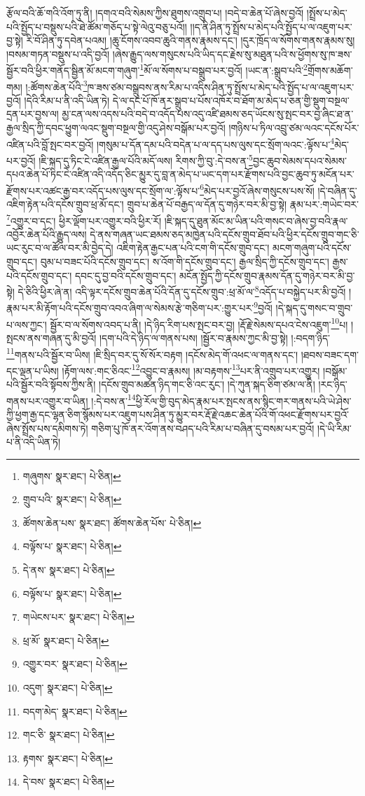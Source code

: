 རྩོལ་བའི་ཆོ་གའི་འོག་ཏུ་ནི། །དགའ་བའི་སེམས་ཀྱིས་ཐུགས་འགྲུབ་པ། །བདེ་བ་ཆེན་པོ་ཞེས་བྱའོ། །སྤྲོས་པ་མེད་པའི་སྤྱོད་པ་བསྡུས་པའི་ཐེ་ཚོམ་གཅོད་པ་སྟེ་ལེའུ་བཅུ་པའོ།། །།ད་ནི་ཤིན་ཏུ་སྤྲོས་པ་མེད་པའི་སྤྱོད་པ་ལ་འཇུག་པར་བྱ་སྟེ། རི་བོ་ཤིན་ཏུ་དབེན་པའམ། །ཆུ་ངོགས་འབབ་ཆུའི་གནས་རྣམས་དང་། །དུར་ཁྲོད་ལ་སོགས་གནས་རྣམས་སུ། །བསམ་གཏན་བསྡུས་པ་འདི་བྱའོ། །ཞེས་རྒྱུད་ལས་གསུངས་པའི་ཡིད་དང་རྗེས་སུ་མཐུན་པའི་ས་ཕྱོགས་སུ་ཁ་ཟས་སྦྱོར་བའི་ཕྱིར་གནོད་སྦྱིན་མོ་མངག་གཞུག་\footnote{གཞུགས་  སྣར་ཐང་།  པེ་ཅིན། }མོ་ལ་སོགས་པ་བསྒྲུབ་པར་བྱའོ། །ཡང་ན་:སྒྲུབ་པའི་\footnote{གྲུབ་པའི་  སྣར་ཐང་།  པེ་ཅིན། }གྲོགས་མཆོག་གམ། །:ཚོགས་ཆེན་པོའི་\footnote{ཚོགས་ཆེན་པས་  སྣར་ཐང་། ཚོགས་ཆེན་པོས་  པེ་ཅིན། }ཁ་ཟས་ཙམ་བསྒྲུབས་ནས་རིམ་པ་འདིས་ཤིན་ཏུ་སྤྲོས་པ་མེད་པའི་སྤྱོད་པ་ལ་འཇུག་པར་བྱའོ། །དེའི་རིམ་པ་ནི་འདི་ཡིན་ཏེ། དེ་ལ་དང་པོ་ཁོ་ནར་སྒྲུབ་པ་པོས་འཁོར་བ་ཐོག་མ་མེད་པ་ཅན་གྱི་སྡུག་བསྔལ་དྲན་པར་བྱས་ལ། མྱ་ངན་ལས་འདས་པའི་བདེ་བ་འདོད་པས་འདུ་འཛི་ཐམས་ཅད་ཡོངས་སུ་སྤང་བར་བྱ་ཞིང་ཐ་ན་རྒྱལ་སྲིད་ཀྱི་དབང་ཕྱུག་ལའང་སྡུག་བསྔལ་གྱི་འདུ་ཤེས་བསྒོམ་པར་བྱའོ། །གཉིས་པ་ཏིལ་འབྲུ་ཙམ་ལའང་དངོས་པོར་འཛིན་པའི་བློ་སྤང་བར་བྱའོ། །གསུམ་པ་དོན་དམ་པའི་བདེན་པ་ལ་དད་པས་ལུས་དང་སྲོག་ལའང་:ལྟོས་པ་\footnote{བལྟོས་པ་  སྣར་ཐང་།  པེ་ཅིན། }མེད་པར་བྱའོ། །ཇི་སྐད་དུ་ཏིང་ངེ་འཛིན་རྒྱལ་པོའི་མདོ་ལས། རིགས་ཀྱི་བུ་:དེ་བས་ན་\footnote{དེ་ནས་  སྣར་ཐང་།  པེ་ཅིན། }བྱང་ཆུབ་སེམས་དཔའ་སེམས་དཔའ་ཆེན་པོ་ཏིང་ངེ་འཛིན་འདི་འདོད་ཅིང་མྱུར་དུ་བླ་ན་མེད་པ་ཡང་དག་པར་རྫོགས་པའི་བྱང་ཆུབ་ཏུ་མངོན་པར་རྫོགས་པར་འཚང་རྒྱ་བར་འདོད་པས་ལུས་དང་སྲོག་ལ་:ལྟོས་པ་\footnote{བལྟོས་པ་  སྣར་ཐང་།  པེ་ཅིན། }མེད་པར་བྱའོ་ཞེས་གསུངས་པས་སོ། །དེ་བཞིན་དུ་འཇིག་རྟེན་པའི་དངོས་གྲུབ་ཕྲ་མོ་དང་། གྲུབ་པ་ཆེན་པོ་བརྒྱད་ལ་དོན་དུ་གཉེར་བར་མི་བྱ་སྟེ། རྣམ་པར་:གཡེང་བར་\footnote{གཡེངས་པར་  སྣར་ཐང་།  པེ་ཅིན། }འགྱུར་བ་དང་། ཕྱིར་ལྡོག་པར་འགྱུར་བའི་ཕྱིར་རོ། །ཇི་སྐད་དུ་ཐུན་མོང་མ་ཡིན་པའི་གསང་བ་ཞེས་བྱ་བའི་རྣལ་འབྱོར་ཆེན་པོའི་རྒྱུད་ལས། དེ་ནས་གཞན་ཡང་ཐམས་ཅད་མཁྱེན་པའི་དངོས་གྲུབ་ཐོབ་པའི་ཕྱིར་དངོས་གྲུབ་གང་ཅི་ཡང་རུང་བ་ལ་ཚོལ་བར་མི་བྱེད་དེ། འཇིག་རྟེན་རྒྱང་པན་པའི་ངག་གི་དངོས་གྲུབ་དང་། མངག་གཞུག་པའི་དངོས་གྲུབ་དང་། བུམ་པ་བཟང་པོའི་དངོས་གྲུབ་དང་། ས་འོག་གི་དངོས་གྲུབ་དང་། རྒྱལ་སྲིད་ཀྱི་དངོས་གྲུབ་དང་། རྒྱས་པའི་དངོས་གྲུབ་དང་། དབང་དུ་བྱ་བའི་དངོས་གྲུབ་དང་། མངོན་སྤྱོད་ཀྱི་དངོས་གྲུབ་རྣམས་དོན་དུ་གཉེར་བར་མི་བྱ་སྟེ། དེ་ཅིའི་ཕྱིར་ཞེ་ན། འདི་ལྟར་དངོས་གྲུབ་ཆེན་པོའི་དོན་དུ་དངོས་གྲུབ་:ཕྲ་མོ་ལ་\footnote{ཕྲ་མོ་  སྣར་ཐང་།  པེ་ཅིན། }འདོད་པ་བསྐྱེད་པར་མི་བྱའོ། །རྣམ་པར་མི་རྟོག་པའི་དངོས་གྲུབ་འབའ་ཞིག་ལ་སེམས་རྩེ་གཅིག་པར་:གྱུར་པར་\footnote{འགྱུར་བར་  སྣར་ཐང་།  པེ་ཅིན། }བྱའོ། །དེ་སྐད་དུ་གསང་བ་གྲུབ་པ་ལས་ཀྱང་། སྦྱོར་བ་ལ་སོགས་འབད་པ་ནི། །དེ་ཉིད་རིག་པས་སྤང་བར་བྱ། །རྡོ་རྗེ་སེམས་དཔའ་ངེས་འཇུག་\footnote{འདུག་  སྣར་ཐང་།  པེ་ཅིན། }པ། །སྤངས་ནས་གཞན་དུ་མི་བྱའོ། །དག་པའི་དེ་ཉིད་ལ་གནས་པས། །སྦྱོར་བ་རྣམས་ཀྱང་མི་བྱ་སྟེ། །:བདག་ཉིད་\footnote{བདག་མེད་  སྣར་ཐང་།  པེ་ཅིན། }གནས་པའི་སྦྱོར་བ་ཡིས། །ཇི་སྲིད་བར་དུ་སོ་སོར་བརྟག །དངོས་མེད་གོ་འཕང་ལ་གནས་དང་། །ཐབས་བཟང་དག་དང་ལྡན་པ་ཡིས། །རྟོག་ལས་:གང་ཅིའང་\footnote{གང་ཅི་  སྣར་ཐང་།  པེ་ཅིན། }འབྱུང་བ་རྣམས། །མ་བརྟགས་\footnote{རྟགས་  སྣར་ཐང་།  པེ་ཅིན། }པར་ནི་འགྲུབ་པར་འགྱུར། །བསྒོམ་པའི་སྦྱོར་བའི་སྟོབས་ཀྱིས་ནི། །དངོས་གྲུབ་མཚན་ཉིད་གང་ཅི་འང་རུང་། །དེ་ཀུན་སྐད་ཅིག་ཙམ་ལ་ནི། །རང་ཉིད་གནས་པར་འགྱུར་བ་ཡིན། །:དེ་བས་ན་\footnote{དེ་བས་  སྣར་ཐང་།  པེ་ཅིན། }ཕྱི་རོལ་གྱི་བུད་མེད་རྣམ་པར་སྤངས་ནས་སྙིང་གར་གནས་པའི་ཡེ་ཤེས་ཀྱི་ཕྱག་རྒྱ་དང་ལྷན་ཅིག་སྙོམས་པར་འཇུག་པས་ཤིན་ཏུ་མྱུར་བར་རྡོ་རྗེ་འཆང་ཆེན་པོའི་གོ་འཕང་རྫོགས་པར་བྱའོ་ཞེས་སྤྲོས་པས་དམིགས་ཏེ། གཅིག་པུ་ཁོ་ནར་འོག་ནས་བཤད་པའི་རིམ་པ་བཞིན་དུ་བསམ་པར་བྱའོ། །དེ་ཡི་རིམ་པ་ནི་འདི་ཡིན་ཏེ། 
